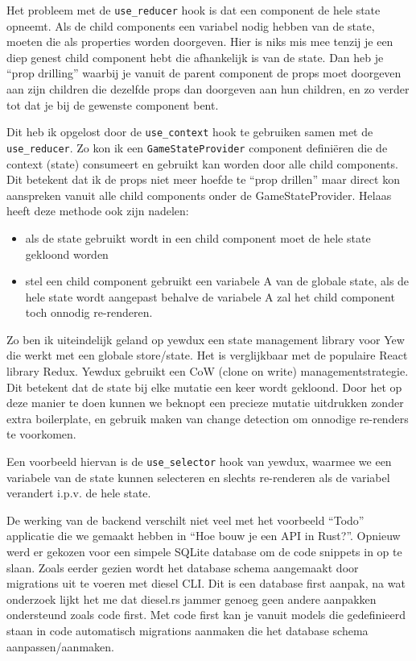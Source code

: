 Het probleem met de \texttt{use_reducer} hook is dat een component de hele state opneemt.
Als de child components een variabel nodig hebben van de state, moeten die als properties worden
doorgeven. Hier is niks mis mee tenzij je een diep genest child component hebt die afhankelijk is
van de state. Dan heb je “prop drilling” waarbij je vanuit de parent component de props moet
doorgeven aan zijn children die dezelfde props dan doorgeven aan hun children, en zo verder tot dat
je bij de gewenste component bent.

Dit heb ik opgelost door de \texttt{use_context} hook te gebruiken samen met de
\texttt{use_reducer}. Zo kon ik een \texttt{GameStateProvider} component
definiëren die de context (state) consumeert en gebruikt kan worden door alle child components. Dit
betekent dat ik de props niet meer hoefde te “prop drillen” maar direct kon aanspreken vanuit alle
child components onder de GameStateProvider. Helaas heeft deze methode ook zijn nadelen: 
\begin{itemize}
    \item als de state gebruikt wordt in een child component moet de hele state gekloond worden 

    \item stel een child component gebruikt een variabele A van de globale state, als de hele state
    wordt aangepast behalve de variabele A zal het child component toch onnodig re-renderen. 
\end{itemize}

Zo ben ik uiteindelijk geland op yewdux een state management library voor Yew die werkt met een
globale store/state. Het is verglijkbaar met de populaire React library Redux. Yewdux gebruikt een
CoW (clone on write) managementstrategie. Dit betekent dat de state bij elke mutatie een keer wordt
gekloond. Door het op deze manier te doen kunnen we beknopt een precieze mutatie uitdrukken zonder
extra boilerplate, en gebruik maken van change detection om onnodige re-renders te voorkomen. 

Een voorbeeld hiervan is de \texttt{use_selector} hook van yewdux, waarmee we een
variabele van de state kunnen selecteren en slechts re-renderen als de variabel verandert i.p.v. de
hele state.

De werking van de backend verschilt niet veel met het voorbeeld “Todo” applicatie die we gemaakt
hebben in “Hoe bouw je een API in Rust?”. Opnieuw werd er gekozen voor een simpele SQLite database
om de code snippets in op te slaan. Zoals eerder gezien wordt het database schema aangemaakt door
migrations uit te voeren met diesel CLI.  Dit is een database first aanpak, na wat onderzoek lijkt
het me dat diesel.rs jammer genoeg geen andere aanpakken ondersteund zoals code first. Met code
first kan je vanuit models die gedefinieerd staan in code automatisch migrations aanmaken die het
database schema aanpassen/aanmaken. 

